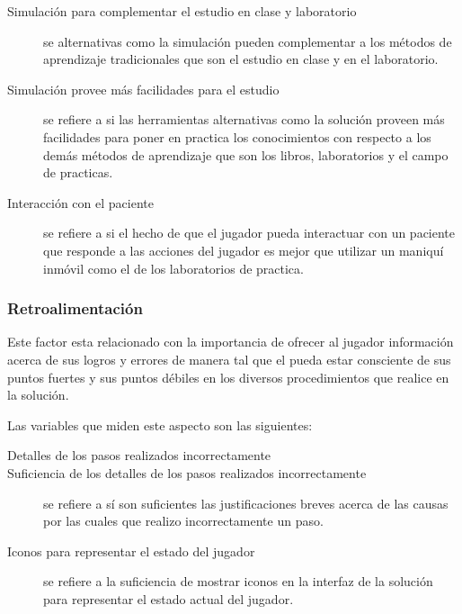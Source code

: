 \begin{description}

\item[Simulación para complementar el estudio en clase y laboratorio] se
     alternativas como la
    simulación pueden complementar a los métodos de aprendizaje tradicionales
    que son el estudio en clase y en el laboratorio.

\item[Simulación provee más facilidades para el estudio] se refiere a si las
    herramientas alternativas como la solución proveen más facilidades para
    poner en practica los conocimientos con respecto a los demás métodos de
    aprendizaje que son los libros, laboratorios y el campo de practicas.

\item[Interacción con el paciente] se refiere a si el hecho de que el jugador
    pueda interactuar con un paciente que responde a las acciones del jugador es
    mejor que utilizar un maniquí inmóvil como el de los laboratorios de
    practica.

\end{description}

\subsubsection{Retroalimentación}
\label{sec:sub_retroalimentacion}

Este factor esta relacionado con la importancia de ofrecer al jugador
información acerca de sus logros y errores de manera tal que el pueda estar
consciente de sus puntos fuertes y sus puntos débiles en los diversos
procedimientos que realice en la solución.

Las variables que miden este aspecto son las siguientes:

\begin{description}

\item[Detalles de los pasos realizados incorrectamente] 

\item[Suficiencia de los detalles de los pasos realizados
    incorrectamente] se refiere a sí son suficientes las justificaciones breves
    acerca de las causas por las cuales que realizo incorrectamente un paso.

\item[Iconos para representar el estado del jugador] se refiere a la
    suficiencia de mostrar iconos en la interfaz de la solución para
    representar el estado actual del jugador.

\end{description}

